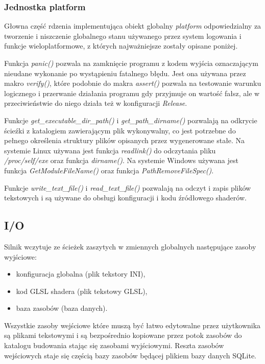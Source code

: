 \subsubsection{Jednostka platform}
Głowna część rdzenia implementująca obiekt globalny \textit{platform} odpowiedzialny za tworzenie i niszczenie globalnego stanu używanego przez system logowania i funkcje wieloplatformowe, z których najważniejsze zostały opisane poniżej.

Funkcja \textit{panic()} pozwala na zamknięcie programu z kodem wyjścia oznaczającym nieudane wykonanie po wystąpieniu fatalnego błędu.
Jest ona używana przez makro \textit{verify()}, które podobnie do makra \textit{assert()} pozwala na testowanie warunku logicznego i przerwanie działania programu gdy przyjmuje on wartość fałsz, ale w przeciwieństwie do niego działa też w konfiguracji \textit{Release}.

Funkcje \textit{get\_executable\_dir\_path()} i \textit{get\_path\_dirname()} pozwalają na odkrycie ścieźki z katalogiem zawierającym plik wykonywalny, co jest potrzebne do pełnego określenia struktury plików opisanych przez wygenerowane stałe.
Na systemie Linux używana jest funkcja \textit{readlink()} do odczytania pliku \textit{/proc/self/exe}
oraz funkcja \textit{dirname()}.
Na systemie Windows używana jest funkcja \textit{GetModuleFileName()} oraz funkcja \textit{PathRemoveFileSpec()}.

Funkcje \textit{write\_text\_file()} i \textit{read\_text\_file()} pozwalają na odczyt i zapis plików tekstowych i są używane do obsługi konfiguracji i kodu źródłowego shaderów.

\subsection{I/O}

Silnik wczytuje ze ścieżek zaszytych w zmiennych globalnych następujące zasoby wyjściowe:
\begin{itemize}
	\item konfiguracja globalna (plik tekstory INI),
	\item kod GLSL shadera (plik tekstowy GLSL),
	\item baza zasobów (baza danych).
\end{itemize}

Wszystkie zasoby wejściowe które muszą być łatwo edytowalne przez użytkownika są plikami tekstowymi i są bezpośrednio kopiowane przez potok zasobów do katalogu budowania stając się zasobami wyjściowymi.
Reszta zasobów wejściowych staje się częścią bazy zasobów będącej plikiem bazy danych SQLite.

